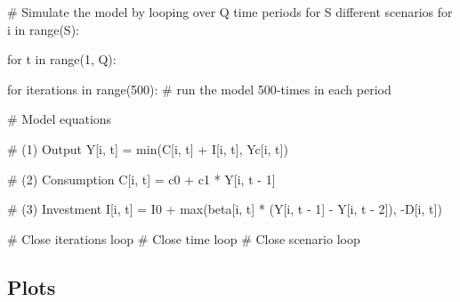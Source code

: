 \documentclass[
  letterpaper,
  DIV=11,
  numbers=noendperiod]{scrreprt}
\newenvironment{Shaded}{\begin{snugshade}}{\end{snugshade}}
\newcommand{\BuiltInTok}[1]{\textcolor[rgb]{0.00,0.23,0.31}{#1}}
\newcommand{\CommentTok}[1]{\textcolor[rgb]{0.37,0.37,0.37}{#1}}
\newcommand{\ControlFlowTok}[1]{\textcolor[rgb]{0.00,0.23,0.31}{#1}}
\newcommand{\DecValTok}[1]{\textcolor[rgb]{0.68,0.00,0.00}{#1}}
\newcommand{\KeywordTok}[1]{\textcolor[rgb]{0.00,0.23,0.31}{#1}}
\newcommand{\NormalTok}[1]{\textcolor[rgb]{0.00,0.23,0.31}{#1}}
\newcommand{\OperatorTok}[1]{\textcolor[rgb]{0.37,0.37,0.37}{#1}}
\begin{document}
\begin{tcolorbox}
\begin{Shaded}
\begin{Highlighting}[]
\CommentTok{\# Simulate the model by looping over Q time periods for S different scenarios}
\ControlFlowTok{for}\NormalTok{ i }\KeywordTok{in} \BuiltInTok{range}\NormalTok{(S):}
    
    \ControlFlowTok{for}\NormalTok{ t }\KeywordTok{in} \BuiltInTok{range}\NormalTok{(}\DecValTok{1}\NormalTok{, Q):}
        
        \ControlFlowTok{for}\NormalTok{ iterations }\KeywordTok{in} \BuiltInTok{range}\NormalTok{(}\DecValTok{500}\NormalTok{):  }\CommentTok{\# run the model 500{-}times in each period}
            
            \CommentTok{\# Model equations}
            
            \CommentTok{\# (1) Output}
\NormalTok{            Y[i, t] }\OperatorTok{=} \BuiltInTok{min}\NormalTok{(C[i, t] }\OperatorTok{+}\NormalTok{ I[i, t], Yc[i, t])}
            
            \CommentTok{\# (2) Consumption}
\NormalTok{            C[i, t] }\OperatorTok{=}\NormalTok{ c0 }\OperatorTok{+}\NormalTok{ c1 }\OperatorTok{*}\NormalTok{ Y[i, t }\OperatorTok{{-}} \DecValTok{1}\NormalTok{]}
            
            \CommentTok{\# (3) Investment}
\NormalTok{            I[i, t] }\OperatorTok{=}\NormalTok{ I0 }\OperatorTok{+} \BuiltInTok{max}\NormalTok{(beta[i, t] }\OperatorTok{*}\NormalTok{ (Y[i, t }\OperatorTok{{-}} \DecValTok{1}\NormalTok{] }\OperatorTok{{-}}\NormalTok{ Y[i, t }\OperatorTok{{-}} \DecValTok{2}\NormalTok{]), }\OperatorTok{{-}}\NormalTok{D[i, t])}
            
        \CommentTok{\# Close iterations loop}
    \CommentTok{\# Close time loop}
\CommentTok{\# Close scenario loop}
\end{Highlighting}
\end{Shaded}

\end{tcolorbox}

\subsection{Plots}\label{plots-13}
\end{document}
